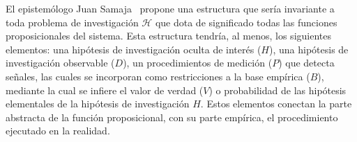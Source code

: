 \documentclass[a4paper,11pt]{book}
\theoremstyle{definition}
\begin{document}

El epistem\'ologo Juan Samaja~\cite{Samaja1999} propone una estructura que ser\'ia invariante a toda problema de investigaci\'on $\mathcal{H}$ que dota de significado todas las funciones proposicionales del sistema.
%
Esta estructura tendr\'ia, al menos, los siguientes elementos: una hip\'otesis de investigaci\'on oculta de inter\'es ($H$), una hip\'otesis de investigaci\'on observable ($D$), un procedimientos de medici\'on ($P$) que detecta se\~nales, las cuales se incorporan como restricciones a la base emp\'irica ($B$), mediante la cual se infiere el valor de verdad ($V$) o probabilidad de las hip\'otesis elementales de la hip\'otesis de investigaci\'on $H$.
%
Estos elementos conectan la parte abstracta de la funci\'on proposicional, con su parte emp\'irica, el procedimiento ejecutado en la realidad.
%
\end{document}

